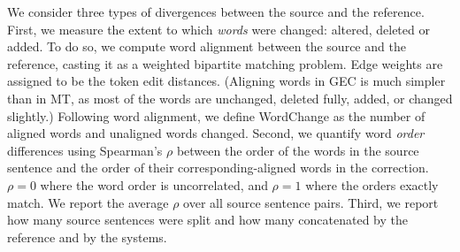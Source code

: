 \documentclass[a4paper]{article}
\begin{document}
We consider three types of divergences between the source and the reference.
First, we measure the extent to which \emph{words} were changed: altered, deleted or added.
To do so, we compute word alignment between the source and the reference, casting it
as a weighted bipartite matching problem. Edge weights are assigned to be the token edit distances.
(Aligning words in GEC is much simpler than in MT,
as most of the words are unchanged, deleted fully, added, or changed slightly.)
Following word alignment, we define {\sc WordChange}
as the number of aligned words and unaligned words changed.
Second, we quantify word \emph{order} differences using
Spearman's $\rho$ between the order of the words in the source sentence
and the order of their corresponding-aligned words in the correction.
$\rho=0$ where the word order is uncorrelated, and $\rho=1$ where the orders exactly match. We report the average $\rho$ over all source sentence pairs. 
Third, we report how many source sentences were split and how many concatenated by the reference and by the systems.
\end{document}
